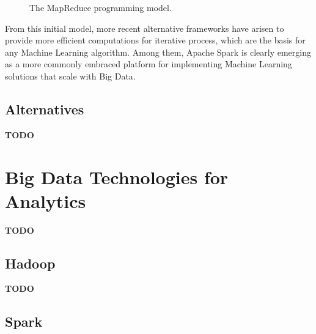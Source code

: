 \documentclass[3p,review]{elsarticle}
\newcommand{\TODO}{\textbf{TODO}}
\begin{document}
\begin{figure}[!ht]
\centering {} \caption{The MapReduce programming model.}
\label{fig:mapreduce}
\end{figure}

From this initial model, more recent alternative frameworks have arisen to provide more efficient computations for iterative process, which are the basis for any Machine Learning algorithm. Among them, Apache Spark \cite{Zaharia12,Zaharia10} is clearly emerging as a more commonly embraced platform for implementing Machine Learning solutions that scale with Big Data.

\subsection{Alternatives}\label{subsec:altMR}

\TODO

\section{Big Data Technologies for Analytics}\label{sec:techno}

\TODO

\subsection{Hadoop}\label{subsec:hadoop}

\TODO

\subsection{Spark}\label{subsec:spark}
\end{document}
